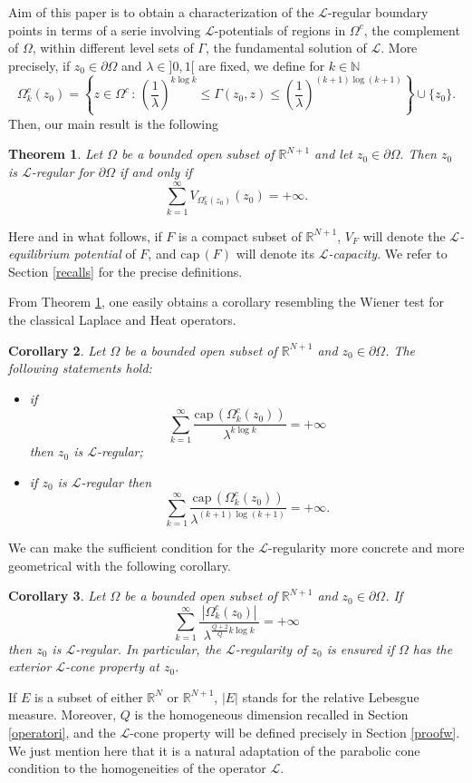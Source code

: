 \documentclass[10pt]{amsart}
\def \de {\partial}
\def \N {\mathbb{N}}
\def \O {\Omega}
\def \RNu {\mathbb{R}^{N+1}}
\def \RN {\mathbb{R}^N}
\def \l {\lambda}
\def\elle{\mathcal{L}}
\def\erre{\mathbb{R}}
\def\erreu{{\erre^{ {N+1} }}}
\newtheorem{theorem}{Theorem}[section]
\newtheorem{corollary}[theorem]{Corollary}
\numberwithin{equation}{section}
\begin{document}
Aim of this paper is to obtain a characterization of the $\elle$-regular boundary points in terms of a serie involving $\elle$-potentials of regions in $\Omega^c$, the complement of $\Omega$, within different level sets of $\Gamma$, the fundamental solution of $\elle$. More precisely, if $z_0\in\partial\Omega$ and $\lambda\in ]0,1[$ are fixed, we define for $k\in\N$
$$\O_{k}^c(z_0)=\left\{z \in \Omega^c \,:\,\left(\frac{1}{\l}\right)^{k\log{k}}\leq\Gamma(z_0,z) \leq\left(\frac{1}{\l}\right)^{(k+1)\log{(k+1)}}\right\} \cup \{z_0\}.$$
Then, our main result is the following
\begin{theorem}\label{iff} Let $\Omega$ be a bounded open  subset of $\erreu$ and let $z_0\in\partial\Omega.$ Then $z_0$ is $\elle$-regular for $\de \Omega$  if and only if
\begin{equation} \label{iffeqn} \sum_{k=1}^{\infty}{V_{\Omega^c_k(z_0)}(z_0)}=+\infty.\end{equation} 
\end{theorem}
Here and in what follows,  if $F$ is a compact subset of $\erreu$, $V_F$ will denote the {\it $\elle$-equilibrium potential} of $F$, and $\mathrm{cap\,}(F)$ will denote its {\it $\elle$-capacity}. We refer to Section \ref{recalls} for the precise definitions.

From Theorem \ref{iff}, one easily obtains a corollary resembling the Wiener test for the classical Laplace and Heat operators. 
\begin{corollary}\label{corol} Let $\Omega$ be a bounded open subset of $\erreu$ and $z_0 \in \de\Omega$. The following statements hold:
\begin{itemize} \item[$(i)$] if 
$$\sum_{k=1}^{\infty}{\frac{\mathrm{cap\, } (\Omega^c_k(z_0))}{\l^{k\log{k}}}}=+\infty$$ 
then $z_0$ is $\elle$-regular;
\item[$(ii)$]  if $z_0$ is $\elle$-regular then 
$$\sum_{k=1}^{\infty}{\frac{\mathrm{cap\, } (\Omega^c_k(z_0))}{\l^{(k+1)\log{(k+1)}}}}=+\infty.$$
\end{itemize}
\end{corollary}

We can make the sufficient condition for the $\elle$-regularity more concrete and more geometrical with the following corollary.
\begin{corollary}\label{corol2} Let $\Omega$ be a bounded open subset of $\erreu$ and $z_0 \in \de\Omega$. If
$$\sum_{k=1}^{\infty}{\frac{|\Omega^c_k(z_0)|}{\,\,\l^{\frac{Q+2}{Q}k\log{k}}\,\,}}=+\infty$$
then $z_0$ is $\elle$-regular. In particular, the $\elle$-regularity of $z_0$ is ensured if $\Omega$ has the exterior $\elle$-cone property at $z_0$.
\end{corollary}
If $E$ is a subset of either $\RN$ or $\RNu$, $|E|$ stands for the relative Lebesgue measure. Moreover, $Q$ is the homogeneous dimension recalled in Section \ref{operatori}, and the $\elle$-cone property will be defined precisely in Section \ref{proofw}. We just mention here that it is a natural adaptation of the parabolic cone condition to the homogeneities of the operator $\elle$.
\end{document}
